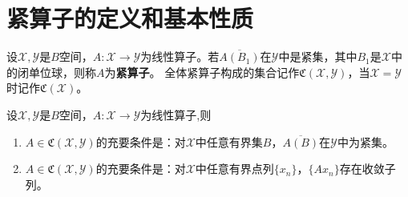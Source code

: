 \documentclass[../../main.tex]{subfiles}%
\begin{document}
\section{紧算子的定义和基本性质}

\begin{definition}
设$\mathscr{X},\mathscr{Y}$是$B$空间，$A:\mathscr{X}\to\mathscr{Y}$为线性算子。若$\overline{A(B_1)}$在$\mathscr{Y}$中是紧集，其中$B_1$是$\mathscr{X}$中的闭单位球，则称$A$为\textbf{紧算子}。
全体紧算子构成的集合记作$\mathfrak{C}(\mathscr{X},\mathscr{Y})$，当$\mathscr{X}=\mathscr{Y}$时记作$\mathfrak{C}(\mathscr{X})$。
\end{definition}

\begin{proposition}\label{proposition:紧算子的充要条件}
设$\mathscr{X},\mathscr{Y}$是$B$空间，$A:\mathscr{X}\to\mathscr{Y}$为线性算子,则
\begin{enumerate}[(1)]
\item $A\in\mathfrak{C}(\mathscr{X},\mathscr{Y})$的充要条件是：对$\mathscr{X}$中任意有界集$B$，$\overline{A(B)}$在$\mathscr{Y}$中为紧集。

\item $A\in\mathfrak{C}(\mathscr{X},\mathscr{Y})$的充要条件是：对$\mathscr{X}$中任意有界点列$\{x_n\}$，$\{Ax_n\}$存在收敛子列。
\end{enumerate}
\end{proposition}
\end{document}
